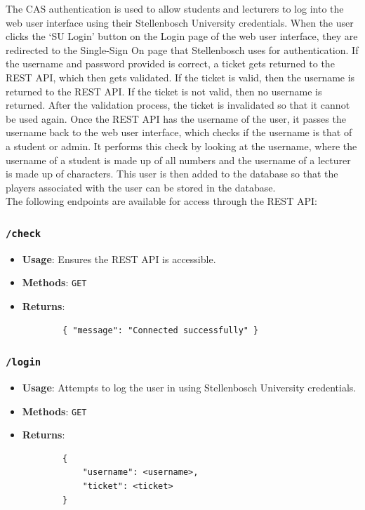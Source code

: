 \documentclass[a4paper, 11pt]{report}
\begin{document}
The CAS authentication is used to allow students and lecturers to log into the
web user interface using their Stellenbosch University credentials. When the
user clicks the `SU Login' button on the Login page of the web user interface,
they are redirected to the Single-Sign On page that Stellenbosch uses for
authentication. If the username and password provided is correct, a ticket gets
returned to the REST API, which then gets validated. If the ticket is valid, then
the username is returned to the REST API. If the ticket is not valid, then no
username is returned. After the validation process, the ticket is invalidated so
that it cannot be used again. Once the REST API has the username of the user,
it passes the username back to the web user interface, which checks if the username
is that of a student or admin. It performs this check by looking at the username,
where the username of a student is made up of all numbers and the username of
a lecturer is made up of characters. This user is then added to the database so
that the players associated with the user can be stored in the database. \\

The following endpoints are available for access through the REST API:
\subsubsection*{\texttt{/check}}
\begin{itemize}
	\item \textbf{Usage}: Ensures the REST API is accessible.
	\item \textbf{Methods}: \texttt{GET}
	\item \textbf{Returns}:
	\begin{verbatim}
		{ "message": "Connected successfully" }
	\end{verbatim}
\end{itemize}
\subsubsection*{\texttt{/login}}
\begin{itemize}
	\item \textbf{Usage}: Attempts to log the user in using Stellenbosch
	University credentials.
	\item \textbf{Methods}: \texttt{GET}
	\item \textbf{Returns}:
	\begin{verbatim}
		{
		    "username": <username>,
		    "ticket": <ticket>
		}
	\end{verbatim}
\end{itemize}
\end{document}

